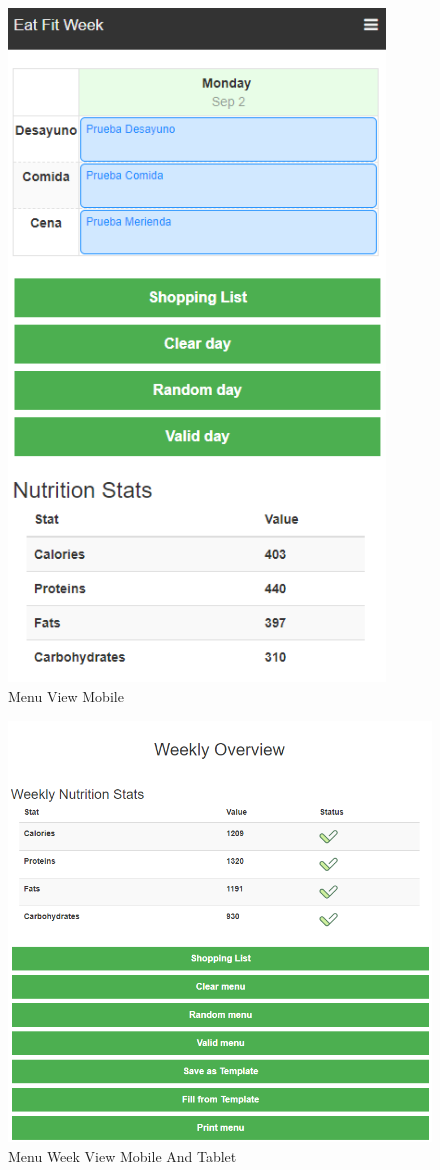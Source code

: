 \documentclass[12pt, a4paper, twoside]{book}
\begin{document}
	\begin{figure}[H]
		\centering
		\includegraphics[width=10cm]{Imagenes/MU-MenuViewMobile.png}
		\caption{Menu View Mobile}\label{Menu View Mobile}
	\end{figure}
	\begin{figure}[H]
		\centering
		\includegraphics[width=15cm]{Imagenes/MU-MenuWeekViewMobileTablet.png}
		\caption{Menu Week View Mobile And Tablet}\label{Menu Week View Mobile And Tablet}
	\end{figure}
\end{document}
